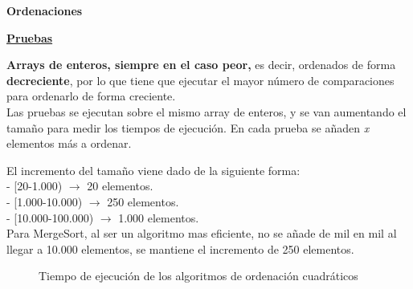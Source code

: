 \begin{flushleft}
\textbf{Ordenaciones}
\begin{mdframed}[roundcorner=5pt]
\textbf{\underline{Pruebas}}
\vspace{0.1cm}

\scriptsize	
\textbf{Arrays de enteros, siempre en el caso peor,} es decir, ordenados de forma \textbf{decreciente}, por lo que tiene que ejecutar el mayor número de comparaciones para ordenarlo de forma creciente.\\	
Las pruebas se ejecutan sobre el mismo array de enteros, y se van aumentando el tamaño para medir los tiempos de ejecución. En cada prueba se añaden \textit{x} elementos más a ordenar.
\begin{tcolorbox}[boxrule=0.5pt, fontupper=\small]
	\scriptsize
	El incremento del tamaño viene dado de la siguiente forma:\\
	- [20-1.000) $\rightarrow$ 20 elementos.\\
	- [1.000-10.000) $\rightarrow$ 250 elementos.\\
	- [10.000-100.000) $\rightarrow$ 1.000 elementos.\\
	Para MergeSort, al ser un algoritmo mas eficiente, no se añade de mil en mil al llegar a 10.000 elementos, se mantiene el incremento de 250 elementos.

\end{tcolorbox}

\end{mdframed}
\end{flushleft}

\newpage

\begin{figure}[h]
	\centering
	\caption{Tiempo de ejecución de los algoritmos de ordenación cuadráticos}
\end{figure}

